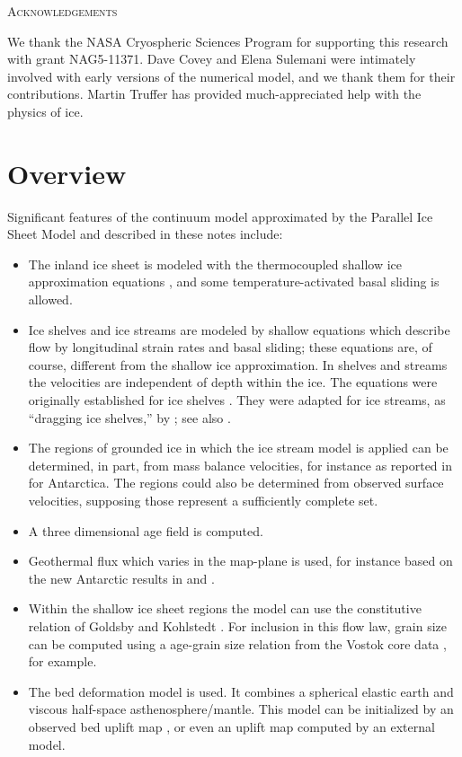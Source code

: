 \documentclass[12pt,final]{amsart}%
\theoremstyle{plain}
\theoremstyle{definition}
\theoremstyle{remark}
\begin{document}
\centerline{\textsc{Acknowledgements}}
\bigskip

We thank the NASA Cryospheric Sciences Program for supporting this research with grant NAG5-11371.  Dave Covey and Elena Sulemani were intimately involved with early versions of the numerical model, and we thank them for their contributions.  Martin Truffer has provided much-appreciated help with the physics of ice.


\newpage
\section{Overview}
Significant features of the continuum model approximated by the Parallel Ice Sheet Model  \citep[``PISM''; see][]{pism-web-page} and described in these notes include:\begin{itemize}
\item The inland ice sheet is modeled with the thermocoupled shallow ice approximation equations \citep{Fowler}, and some temperature-activated basal sliding is allowed.
\item Ice shelves and ice streams are modeled by shallow equations which describe flow by longitudinal strain rates and basal sliding; these equations are, of course, different from the shallow ice approximation.  In shelves and streams the velocities are independent of depth within the ice.  The equations were originally established for ice shelves \citep{Morland,MorlandZainuddin,MacAyealetal}.  They were adapted for ice streams, as ``dragging ice shelves,'' by \citet{MacAyeal}; see also \citep{HulbeMacAyeal}.
\item The regions of grounded ice in which the ice stream model is applied can be determined, in part, from mass balance velocities, for instance as reported in \citep{BamberVaughanJoughin} for Antarctica.  The regions could also be determined from observed surface velocities, supposing those represent a sufficiently complete set.
\item A three dimensional age field is computed.
\item Geothermal flux which varies in the map-plane is used, for instance based on the new Antarctic results in \citep{ShapiroRitzwoller} and \citep{FoxMaule}.
\item Within the shallow ice sheet regions the model can use the constitutive relation of Goldsby and Kohlstedt \citep{GoldsbyKohlstedt,Peltieretal}.  For inclusion in this flow law, grain size can be computed using a age-grain size relation from the Vostok core data \citep{VostokCore}, for example.
\item The \citet{LingleClark} bed deformation model is used.  It combines a spherical elastic earth and viscous half-space asthenosphere/mantle.  This model can be initialized by an observed bed uplift map \citep{BLKfastearth}, or even an uplift map computed by an external model.\end{itemize}
\end{document}
